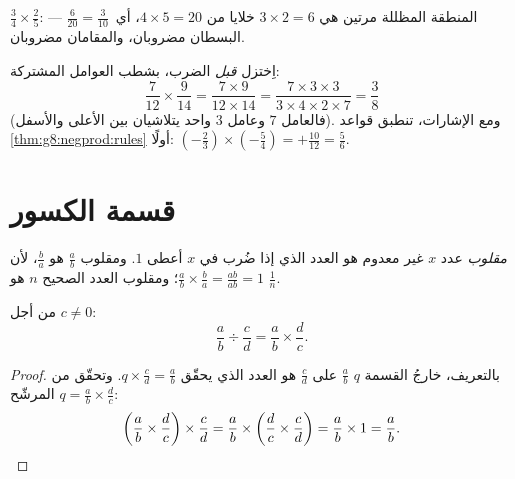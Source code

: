 \begin{omfigure}

{\small $\frac34 \times \frac25$: المنطقة المظللة مرتين هي
$3 \times 2 = 6$ خلايا من $4 \times 5 = 20$، أي\
$\frac{6}{20} = \frac{3}{10}$ --- البسطان مضروبان، والمقامان
مضروبان.}
\end{omfigure}

\begin{example}\label{ex:g8:fractions:mult}
اِختزل \emph{قبل} الضرب، بشطب العوامل المشتركة:
\[
\frac{7}{12} \times \frac{9}{14}
= \frac{7 \times 9}{12 \times 14}
= \frac{7 \times 3 \times 3}{3 \times 4 \times 2 \times 7}
= \frac{3}{8}
\]
(فالعامل $7$ وعامل $3$ واحد يتلاشيان بين الأعلى والأسفل).
ومع الإشارات، تنطبق قواعد \cref{thm:g8:negprod:rules} أولًا:
$\left(-\frac23\right) \times \left(-\frac{5}{4}\right) =
+\frac{10}{12} = \frac56$.
\end{example}

\section{قسمة الكسور}

\begin{definition}[المقلوب]\label{def:g8:fractions:inverse}
\emph{مقلوب} عدد $x$ غير معدوم هو
العدد الذي إذا ضُرب في $x$ أعطى $1$. ومقلوب
$\frac ab$ هو $\frac ba$، لأن
$\frac ab \times \frac ba = \frac{ab}{ab} = 1$؛ ومقلوب العدد
الصحيح $n$ هو $\frac1n$.
\end{definition}

\begin{theorem}\label{thm:g8:fractions:div}
من أجل $c \neq 0$:
\[
\frac{a}{b} \div \frac{c}{d} = \frac{a}{b} \times \frac{d}{c} .
\]
\end{theorem}

\begin{proof}
بالتعريف، خارجُ القسمة $q$  $\frac ab$ على $\frac cd$ هو
العدد الذي يحقّق $q \times \frac cd = \frac ab$. وتحقّق من المرشّح
$q = \frac ab \times \frac dc$:
\[
\left(\frac ab \times \frac dc\right) \times \frac cd
= \frac ab \times \left(\frac dc \times \frac cd\right)
= \frac ab \times 1 = \frac ab . \qedhere
\]
\end{proof}

